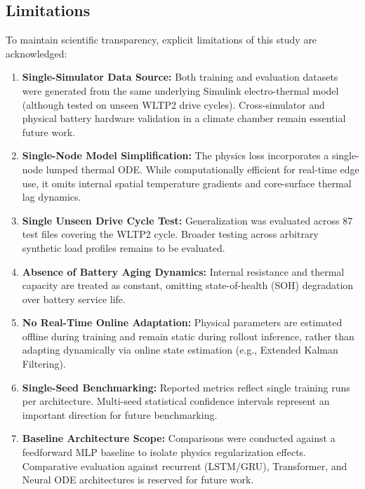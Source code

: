 \subsection{Limitations}
To maintain scientific transparency, explicit limitations of this study are acknowledged:
\begin{enumerate}
    \item \textbf{Single-Simulator Data Source:} Both training and evaluation datasets were generated from the same underlying Simulink electro-thermal model (although tested on unseen WLTP2 drive cycles). Cross-simulator and physical battery hardware validation in a climate chamber remain essential future work.
    \item \textbf{Single-Node Model Simplification:} The physics loss incorporates a single-node lumped thermal ODE. While computationally efficient for real-time edge use, it omits internal spatial temperature gradients and core-surface thermal lag dynamics.
    \item \textbf{Single Unseen Drive Cycle Test:} Generalization was evaluated across 87 test files covering the WLTP2 cycle. Broader testing across arbitrary synthetic load profiles remains to be evaluated.
    \item \textbf{Absence of Battery Aging Dynamics:} Internal resistance and thermal capacity are treated as constant, omitting state-of-health (SOH) degradation over battery service life.
    \item \textbf{No Real-Time Online Adaptation:} Physical parameters are estimated offline during training and remain static during rollout inference, rather than adapting dynamically via online state estimation (e.g., Extended Kalman Filtering).
    \item \textbf{Single-Seed Benchmarking:} Reported metrics reflect single training runs per architecture. Multi-seed statistical confidence intervals represent an important direction for future benchmarking.
    \item \textbf{Baseline Architecture Scope:} Comparisons were conducted against a feedforward MLP baseline to isolate physics regularization effects. Comparative evaluation against recurrent (LSTM/GRU), Transformer, and Neural ODE architectures is reserved for future work.
\end{enumerate}

